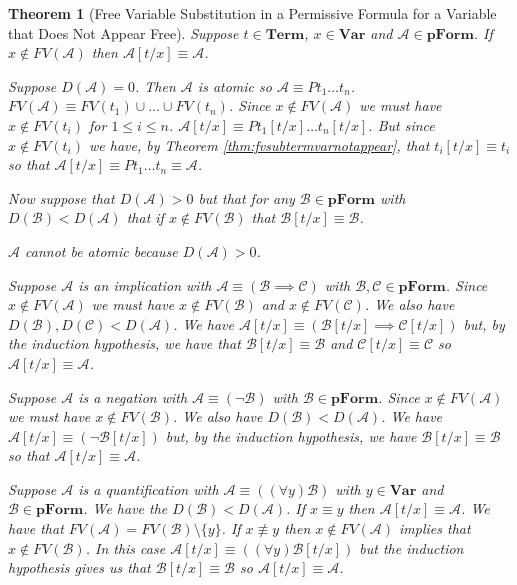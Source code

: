\documentclass[12pt]{article}
\theoremstyle{break}
\theoremstyle{break}
\newtheorem{theorem}{Theorem}[section]
\theoremstyle{break}
\theoremstyle{break}
\theoremstyle{break}
\newtheorem{informal definition}[definition]{Informal Definition}
\newcommand{\mc}[1]{\mathcal{#1}}
\begin{document}
\begin{theorem}[Free Variable Substitution in a Permissive Formula for a Variable that Does Not Appear Free]
\label{thm:fvsubpformnotappear}
Suppose $t\in \textbf{Term}$, $x\in \textbf{Var}$ and $\mc{A} \in \textbf{pForm}$. If $x\not \in FV(\mc{A})$ then $\mc{A}[t/x] \equiv \mc{A}$.

Suppose $D(\mc{A}) = 0$. Then $\mc{A}$ is atomic so $\mc{A} \equiv P t_1\ldots t_n$. $FV(\mc{A}) \equiv FV(t_1)\cup\ldots\cup FV(t_n)$. Since $x\not \in FV(\mc{A})$ we must have $x\not \in FV(t_i)$ for $1\le i \le n$. $\mc{A}[t/x] \equiv Pt_1[t/x]\ldots t_n[t/x]$. But since $x\not \in FV(t_i)$ we have, by Theorem \ref{thm:fvsubtermvarnotappear}, that $t_i[t/x] \equiv t_i$ so that $\mc{A}[t/x] \equiv Pt_1\ldots t_n \equiv \mc{A}$.

Now suppose that $D(\mc{A}) > 0$ but that for any $\mc{B}\in\textbf{pForm}$ with $D(\mc{B}) < D(\mc{A})$ that if $x \not \in FV(\mc{B})$ that $\mc{B}[t/x] \equiv \mc{B}$.

$\mc{A}$ cannot be atomic because $D(\mc{A})>0$.

Suppose $\mc{A}$ is an implication with $\mc{A} \equiv (\mc{B} \implies \mc{C})$ with $\mc{B}, \mc{C}\in\textbf{pForm}$.
Since $x\not \in FV(\mc{A})$ we must have $x\not \in FV(\mc{B})$ and $x \not \in FV(\mc{C})$.
We also have $D(\mc{B}), D(\mc{C}) < D(\mc{A})$.
We have $\mc{A}[t/x] \equiv (\mc{B}[t/x] \implies \mc{C}[t/x])$ but, by the induction hypothesis, we have that $\mc{B}[t/x] \equiv \mc{B}$ and $\mc{C}[t/x] \equiv \mc{C}$ so $\mc{A}[t/x] \equiv \mc{A}$.

Suppose $\mc{A}$ is a negation with $\mc{A} \equiv (\lnot \mc{B})$ with $\mc{B}\in\textbf{pForm}$.
Since $x\not \in FV(\mc{A})$ we must have $x\not \in FV(\mc{B})$.
We also have $D(\mc{B}) < D(\mc{A})$.
We have $\mc{A}[t/x] \equiv (\lnot \mc{B}[t/x])$ but, by the induction hypothesis, we have $\mc{B}[t/x] \equiv \mc{B}$ so that $\mc{A}[t/x] \equiv \mc{A}$.

Suppose $\mc{A}$ is a quantification with $\mc{A} \equiv ((\forall y)\mc{B})$ with $y\in\textbf{Var}$ and $\mc{B}\in\textbf{pForm}$.
We have the $D(\mc{B}) < D(\mc{A})$.
If $x\equiv y$ then $\mc{A}[t/x] \equiv \mc{A}$.
We have that $FV(\mc{A}) = FV(\mc{B})\setminus\{y\}$.
If $x \not \equiv y$ then $x\not \in FV(\mc{A})$ implies that $x\not \in FV(\mc{B})$.
In this case $\mc{A}[t/x] \equiv ((\forall y) \mc{B}[t/x])$ but the induction hypothesis gives us that $\mc{B}[t/x] \equiv \mc{B}$ so $\mc{A}[t/x] \equiv \mc{A}$.
\end{theorem}
\end{document}
